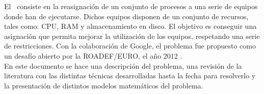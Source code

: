 \documentclass[../informe2.tex]{subfiles}
\begin{document}
El \mrp\ consiste en la reasignación de un conjunto de procesos a una serie de equipos donde han de ejecutarse. Dichos equipos disponen de un conjunto de recursos, tales como: CPU, RAM y almacenamiento en disco. El objetivo es conseguir una asignación que permita mejorar la utilización de los equipos, respetando una serie de restricciones. Con la colaboración de Google, el problema fue propuesto como un desafío abierto por la ROADEF/EURO, el año 2012 \cite{2012ProblemDefinition}. \\
En este documento se hace una descripción del problema, una revisión de la literatura con las distintas técnicas desarrolladas hasta la fecha para resolverlo y la presentación de distintos modelos matemáticos del problema.
\end{document}
